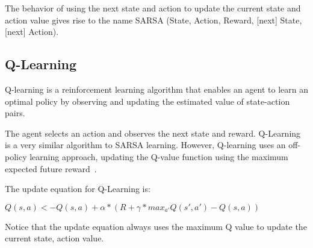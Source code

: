 The behavior of using the next state and action to update the current state and action value gives rise to the name SARSA (State, Action, Reward, [next] State, [next] Action).

\subsection{Q-Learning}
Q-learning is a reinforcement learning algorithm that enables an agent to learn an optimal policy by observing and updating the estimated value of state-action pairs.

The agent selects an action and observes the next state and reward.
Q-Learning is a very similar algorithm to SARSA learning. However, Q-learning uses an off-policy learning approach, updating the Q-value function using the maximum expected future reward~\citep{sutton2018reinforcement}.

The update equation for Q-Learning is:

$Q(s,a) <- Q(s,a) + \alpha*(R + \gamma*max_{a'}Q(s',a') - Q(s,a))$

Notice that the update equation always uses the maximum Q value to update the current state, action value.
